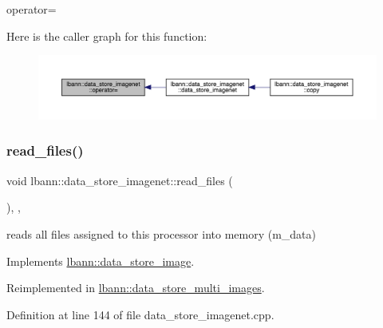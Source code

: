 operator= 

Here is the caller graph for this function\+:\nopagebreak
\begin{figure}[H]
\begin{center}
\leavevmode
\includegraphics[width=350pt]{classlbann_1_1data__store__imagenet_a71b04726b0e651bc9b73cd6f5ca3c12b_icgraph}
\end{center}
\end{figure}
\mbox{\label{classlbann_1_1data__store__imagenet_a70cfd8f529aad8d66993000da7350ec5}} 
\subsubsection{\texorpdfstring{read\+\_\+files()}{read\_files()}}
{\footnotesize\ttfamily void lbann\+::data\+\_\+store\+\_\+imagenet\+::read\+\_\+files (\begin{DoxyParamCaption}{ }\end{DoxyParamCaption})\hspace{0.3cm}{\ttfamily [override]}, {\ttfamily [protected]}, {\ttfamily [virtual]}}



reads all files assigned to this processor into memory (m\+\_\+data) 



Implements \hyperlink{classlbann_1_1data__store__image_a146874a68c24213f5509efb9727cb6e5}{lbann\+::data\+\_\+store\+\_\+image}.



Reimplemented in \hyperlink{classlbann_1_1data__store__multi__images_a8ce8ccf3c7b0d19adfb838108bec075b}{lbann\+::data\+\_\+store\+\_\+multi\+\_\+images}.



Definition at line 144 of file data\+\_\+store\+\_\+imagenet.\+cpp.


